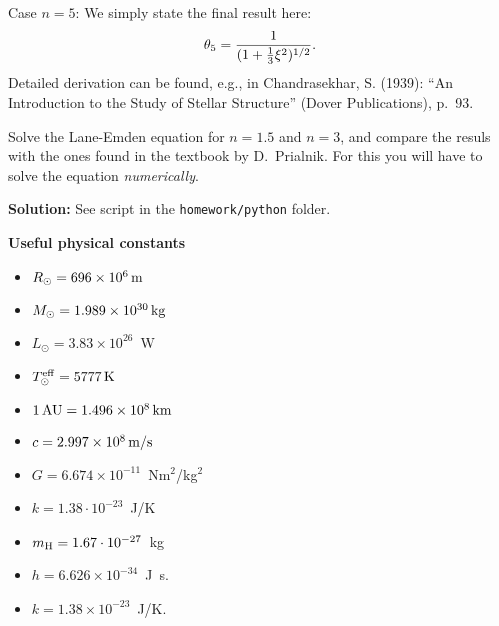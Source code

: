 \documentclass[12pt]{article}
\def\onethird{{\textstyle{1\over3}}}
\begin{document}
\noindent
Case $n=5$: We simply state the final result here:
\begin{equation}
\theta_5 = \frac{1}{(1+\onethird \xi^2)^{1/2}}.
\end{equation}
Detailed derivation can be found, e.g., in Chandrasekhar, S. (1939):
``An Introduction to the Study of Stellar Structure'' (Dover
Publications), p.\ 93.


Solve the Lane-Emden equation for $n=1.5$ and $n=3$, and compare the
resuls with the ones found in the textbook by D.\ Prialnik. For this
you will have to solve the equation \emph{numerically}.

{\bf Solution:} See script in the \texttt{homework/python} folder.


{\bf Useful physical constants}
\begin{itemize}
  \item $R_{\odot} = 696 \times 10^6\,{\rm m}$
  \item $M_{\odot} = 1.989 \times 10^{30}\,{\rm kg}$
  \item $L_{\odot} = 3.83 \times 10^{26}$~W
  \item $T^{\rm eff}_{\odot} = 5777\,{\rm K}$
  \item $1\,{\rm AU} = 1.496 \times 10^8\,{\rm km}$
  \item $c = 2.997 \times 10^8\,{\rm m/s}$
  \item $G = 6.674 \times 10^{-11}$~Nm$^2$/kg$^2$
  \item $k = 1.38\cdot10^{-23}$~J/K
  \item $m_{\rm H} = 1.67\cdot10^{-27}$~kg
  \item $h=6.626 \times 10^{-34}$~J~s.
  \item $k=1.38 \times 10^{-23}$~J/K.
\end{itemize}
\end{document}

